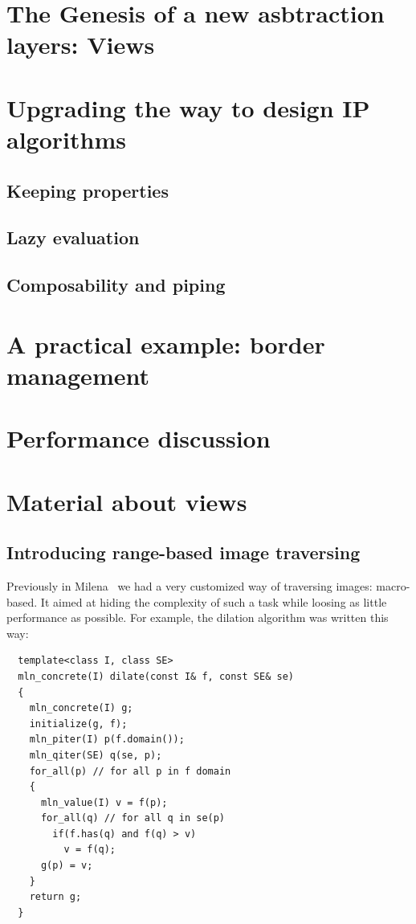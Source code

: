 \chapter{The Genesis of a new asbtraction layers: Views}

\chapter{Upgrading the way to design IP algorithms}

\section{Keeping properties}

\section{Lazy evaluation}

\section{Composability and piping}

\chapter{A practical example: border management}

\chapter{Performance discussion}


\chapter*{Material about views}

\section{Introducing range-based image traversing}
\label{sec.range.traversing}

Previously in Milena~\cite{levillain.2009.ismm} we had a very customized way of traversing images: macro-based. It aimed
at hiding the complexity of such a task while loosing as little performance as possible. For example, the dilation
algorithm was written this way:

\begin{verbatim}
  template<class I, class SE>
  mln_concrete(I) dilate(const I& f, const SE& se)
  {
    mln_concrete(I) g;
    initialize(g, f);
    mln_piter(I) p(f.domain());
    mln_qiter(SE) q(se, p);
    for_all(p) // for all p in f domain
    {
      mln_value(I) v = f(p);
      for_all(q) // for all q in se(p)
        if(f.has(q) and f(q) > v)
          v = f(q);
      g(p) = v;
    }
    return g;
  }
\end{verbatim}

